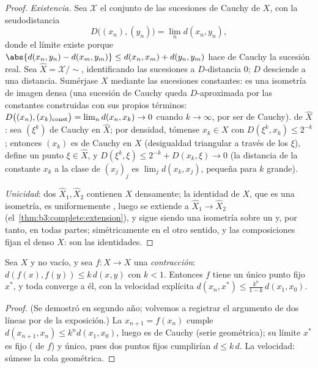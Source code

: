 \begin{proof}
\emph{Existencia.} Sea $\mathcal X$ el conjunto de las sucesiones de
Cauchy de $X$, con la seudodistancia
\[
D\bigl((x_n), (y_n)\bigr) = \lim_n d(x_n, y_n),
\]
donde el límite existe porque $\abs{d(x_n, y_n) - d(x_m, y_m)}
\leq d(x_n, x_m) + d(y_n, y_m)$ hace de Cauchy la sucesión real. Sea
$\hat X = \mathcal X/{\sim}$, identificando las sucesiones a
$D$-distancia $0$; $D$ desciende a una distancia. Sumérjase $X$ mediante
las sucesiones constantes: es una isometría de imagen densa (una
sucesión de Cauchy queda $D$-aproximada por las constantes construidas
con sus propios términos: $D\bigl((x_n), (x_k)_{\rm
const}\bigr) = \lim_n d(x_n, x_k) \to 0$ cuando $k \to \infty$, por ser
de Cauchy).  de $\hat X$:
sea $(\xi^k)$ de Cauchy en $\hat X$; por densidad, tómense $x_k \in X$
con $D(\xi^k, x_k)
\leq 2^{-k}$; entonces $(x_k)$ es de Cauchy en $X$ (desigualdad
triangular a través de los $\xi$), define un punto $\xi \in \hat
X$, y $D(\xi^k, \xi) \leq 2^{-k} + D(x_k, \xi) \to 0$ (la distancia de
la constante $x_k$ a la clase de $(x_j)_j$ es $\lim_j d(x_k, x_j)$,
pequeña para $k$ grande).

\emph{Unicidad}: dos 
$\hat X_1, \hat X_2$ contienen $X$ densamente; la identidad de $X$, que
es una isometría, es uniformemente
, luego se extiende a
$\hat X_1 \to \hat X_2$ (el~\cref{thm:b3:complete:extension}), y sigue
siendo una isometría sobre un  y, por tanto, en todas partes; simétricamente en el otro sentido,
y las composiciones fijan el denso $X$: son las identidades.
\end{proof}

\begin{theorem}\label{thm:b3:complete:banach}
Sea $X$  y no vacío, y sea
$f \colon X \to X$ una \emph{contracción}:
$d(f(x), f(y)) \leq k\,d(x,y)$ con $k < 1$. Entonces $f$ tiene un único
punto fijo $x^*$, y toda  converge
a él, con la velocidad explícita $d(x_n, x^*) \leq
\frac{k^n}{1-k}\,d(x_1, x_0)$.
\end{theorem}

\begin{proof}
(Se demostró en segundo año; volvemos a registrar el argumento de dos
líneas por  de la exposición.) La
 $x_{n+1} = f(x_n)$ cumple
$d(x_{n+1},
x_n) \leq k^nd(x_1, x_0)$, luego es de Cauchy (serie geométrica); su
límite $x^*$ es fijo (
de $f$) y único, pues dos puntos fijos cumplirían $d \leq k\,d$. La
velocidad: súmese la cola geométrica.
\end{proof}

